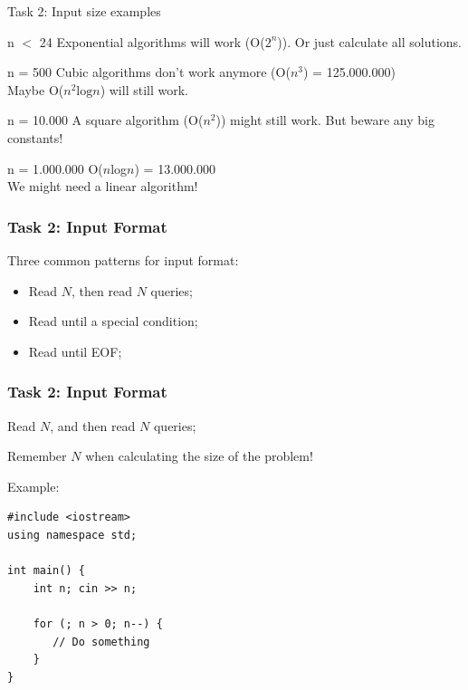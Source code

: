 \begin{frame}{Task 2: Input size examples}

  \begin{block}{n $<$ 24}
    Exponential algorithms will work (O($2^n$)). Or just calculate all solutions.
  \end{block}

  \begin{block}{n = 500}
    Cubic algorithms don't work anymore (O($n^3$) = 125.000.000)\\
    Maybe O($n^2\text{log}n$) will still work.
  \end{block}

  \begin{block}{n = 10.000}
    A square algorithm (O($n^2$)) might still work. But beware any big constants!
  \end{block}

  \begin{block}{n = 1.000.000}
    O($n$log$n$) = 13.000.000\\
    We might need a linear algorithm!
  \end{block}
\end{frame}

\begin{frame}
  \frametitle{Task 2: Input Format}

  Three common patterns for input format:
  \vfill

  \begin{itemize}
  \item Read $N$, then read $N$ queries;
  \bigskip

  \item Read until a special condition;
  \bigskip

  \item Read until EOF;
  \end{itemize}
\end{frame}

\begin{frame}[fragile]
  \frametitle{Task 2: Input Format}
  \begin{block}{}
    Read $N$, and then read $N$ queries;
    \bigskip

    Remember $N$ when calculating the size of the problem!
  \end{block}
  Example: 

{\smaller
\begin{verbatim}
#include <iostream>
using namespace std;

int main() {
    int n; cin >> n;

    for (; n > 0; n--) {
       // Do something
    }
}
\end{verbatim}}

\end{frame}

